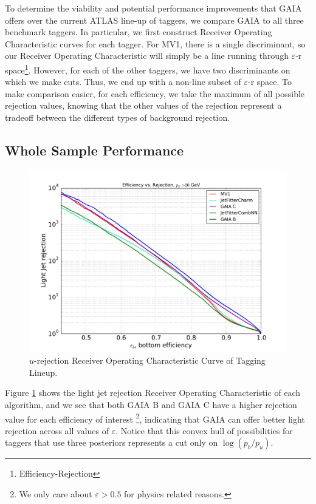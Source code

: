 \newcommand{\roc}{Receiver Operating Characteristic }
\newcommand{\er}{$\varepsilon$-r }

To determine the viability and potential performance improvements that GAIA offers over the current ATLAS line-up of taggers, we compare GAIA to all three benchmark taggers. In particular, we first construct \roc curves for each tagger. For MV1, there is a single discriminant, so our \roc will simply be a line running through \er space\footnote{Efficiency-Rejection}. However, for each of the other taggers, we have two discriminants on which we make cuts. Thus, we end up with a non-line subset of \er space. To make comparison easier, for each efficiency, we take the maximum of all possible rejection values, knowing that the other values of the rejection represent a tradeoff between the different types of background rejection.

\subsection{Whole Sample Performance}
\begin{figure}[h]
\includegraphics[width=\textwidth]{figures/btag/u_rej_ROC.pdf}
\caption[The ATLAS detector]{$u$-rejection Receiver Operating Characteristic Curve of Tagging Lineup.
\label{fig:urejROC}}
\end{figure}

Figure \ref{fig:urejROC} shows the light jet rejection \roc of each algorithm, and we see that both GAIA B and GAIA C have a higher rejection value for each efficiency of interest \footnote{We only care about $\varepsilon>0.5$ for physics related reasons.}, indicating that GAIA can offer better light rejection across all values of $\varepsilon$. Notice that this convex hull of possibilities for taggers that use three posteriors represents a cut only on $\log(p_b/p_u)$.


